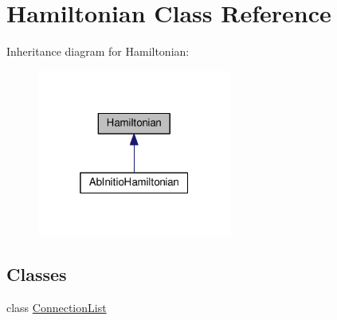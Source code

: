 \hypertarget{classHamiltonian}{}\section{Hamiltonian Class Reference}
\label{classHamiltonian}


Inheritance diagram for Hamiltonian\+:\nopagebreak
\begin{figure}[H]
\begin{center}
\leavevmode
\includegraphics[width=181pt]{classHamiltonian__inherit__graph}
\end{center}
\end{figure}
\subsection*{Classes}
\begin{DoxyCompactItemize}
\item 
class \hyperlink{classHamiltonian_1_1ConnectionList}{Connection\+List}
\end{DoxyCompactItemize}
